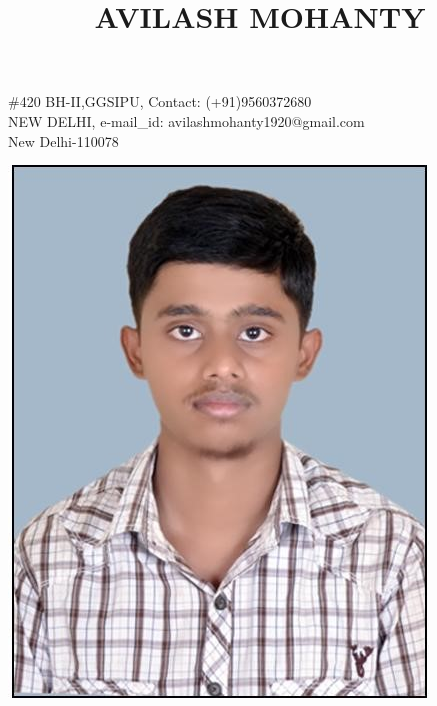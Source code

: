 \documentclass[11pt]{article}
\begin{document}
\title{\begin{huge}AVILASH MOHANTY\end{huge}}
\maketitle

\begin{flushleft}
$\#$420 BH-II,GGSIPU, 
\hfill{Contact: (+91)9560372680}\\
NEW DELHI, 
\hfill{e-mail\_id: avilashmohanty1920@gmail.com}\\
New Delhi-110078

\end{flushleft}

\begin{flushright}
\includegraphics [scale=0.25]{picture.jpg}
\end{flushright}

	
\end{document}
